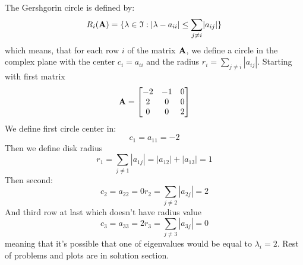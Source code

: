 The Gershgorin circle is defined by:
\begin{equation}
    R_i(\mathbf{A}) = \{\lambda\in\mathfrak{I}:\lvert\lambda-a_{ii}\rvert\le\sum_{j\ne{}i}\lvert{}a_{ij}\rvert\}
\end{equation}
which means, that for each row $i$ of the matrix $\mathbf{A}$, we define a circle in the complex plane with
the center $c_i = a_{ii}$ and the radius $r_i = \sum_{j \neq i} |a_{ij}|$.
Starting with first matrix
\begin{equation*}
    \mathbf{A} = 
    \begin{bmatrix}
        -2 & -1 &  0\\
         2 &  0 &  0\\
         0 &  0 &  2 
    \end{bmatrix}
\end{equation*}
We define first circle center in:
\begin{equation*}
     c_1 = a_{11} = -2
\end{equation*}
Then we define disk radius
\begin{equation*}
    r_1 = \sum_{j \neq 1} |a_{1j}| = |a_{12}| + |a_{13}| = 1 
\end{equation*}
Then second:
\begin{equation*}
    c_2 = a_{22} = 0
    r_2 = \sum_{j \neq 2} |a_{2j}| = 2
\end{equation*}
And third row at last which doesn't have radius value
\begin{equation*}
    c_3 = a_{33} = 2
    r_3 = \sum_{j \neq 3} |a_{3j}| = 0
\end{equation*}
meaning that it's possible that one of eigenvalues would be equal to $\lambda_i = 2$.
Rest of problems and plots are in solution section.

